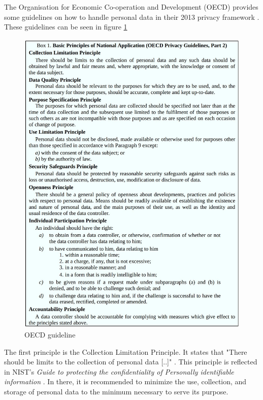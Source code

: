         The Organisation for Economic Co-operation and Development (OECD) provides some guidelines on how to handle personal data in their 2013 privacy framework \cite{oecd_oecd_2013}. These guidelines can be seen in figure \ref{fig:oecd_guide} 
        \begin{figure}
            \centering
            \includegraphics[width=\textwidth]{latex/figures/oecd_guidelines.jpg}
            \caption[OECD guideline]{OECD guideline \cite{oecd_oecd_2013}}
            \label{fig:oecd_guide}
        \end{figure}
        The first principle is the Collection Limitation Principle. It states that "There should be limits to the collection of personal data [..]" \cite{oecd_oecd_2013}. This principle is reflected in NIST's \textit{Guide to protecting the confidentiality of Personally identifiable information} \cite{mccallister_guide_2010}. In there, it is recommended to minimize the use, collection, and storage of personal data to the minimum necessary to serve its purpose.
